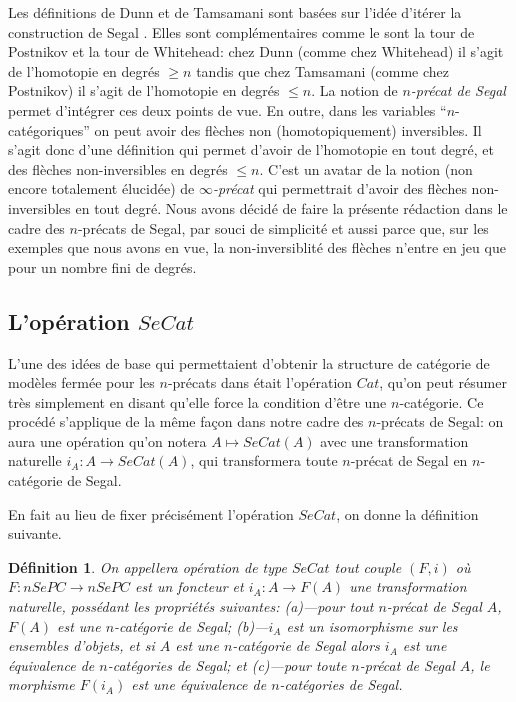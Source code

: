 \documentclass[12pt]{article}
\newcommand{\subnumero}[1]{\subsection*{#1}\phantomsection\addcontentsline{toc}{subsection}{#1}}
\newtheorem{definition}[lemma]{D\'efinition}
\begin{document}
Les d\'efinitions de Dunn et de Tamsamani
sont bas\'ees sur l'id\'ee d'it\'erer la construction de Segal
\cite{Segal}. Elles sont compl\'ementaires  comme le sont la
tour de Postnikov et la tour de Whitehead: chez Dunn (comme chez Whitehead)
il s'agit
de l'homotopie en degr\'es $\geq n$ tandis que chez Tamsamani (comme chez
Postnikov)
il s'agit de l'homotopie en degr\'es $\leq n$. La notion de {\em $n$-pr\'ecat de
Segal} permet d'int\'egrer ces deux points de vue. En outre, dans les variables
``$n$-cat\'egoriques'' on peut avoir des fl\`eches non (homotopiquement)
inversibles. Il s'agit donc d'une d\'efinition qui permet d'avoir de l'homotopie
en tout degr\'e, et des fl\`eches non-inversibles en degr\'es $\leq n$. C'est
un avatar de la notion (non encore totalement \'elucid\'ee) de {\em
$\infty$-pr\'ecat} qui
permettrait d'avoir des fl\`eches non-inversibles en tout degr\'e. Nous avons
d\'ecid\'e de faire la pr\'esente r\'edaction dans le cadre des $n$-pr\'ecats de
Segal, par souci de simplicit\'e et aussi parce que, sur les exemples que
nous avons en vue,
la non-inversiblit\'e des fl\`eches n'entre en jeu que pour un nombre fini
de degr\'es.


\subnumero{L'op\'eration \texorpdfstring{$SeCat$}{SeCat}}

L'une des id\'ees de base qui permettaient d'obtenir la structure de cat\'egorie
de mod\`eles ferm\'ee pour les $n$-pr\'ecats dans \cite{nCAT} \'etait
l'op\'eration $Cat$, qu'on peut r\'esumer tr\`es simplement en disant
qu'elle force
la condition d'\^etre une $n$-cat\'egorie. Ce proc\'ed\'e s'applique de la
m\^eme
fa\c{c}on dans
notre cadre des $n$-pr\'ecats de Segal: on aura une op\'eration qu'on notera
$A\mapsto SeCat(A)$ avec une transformation naturelle $i_A: A\rightarrow
SeCat(A)$, qui transformera toute $n$-pr\'ecat de Segal en
$n$-cat\'egorie de Segal.

En fait au lieu de fixer pr\'ecis\'ement l'op\'eration $SeCat$, on
donne la d\'efinition suivante.

\begin{definition}
\label{secat}
On appellera {\em op\'eration de type $SeCat$} tout couple $(F, i)$ o\`u
$F:nSePC\rightarrow nSePC$ est un foncteur et $i_A: A\rightarrow F(A)$ une
transformation naturelle, poss\'edant les propri\'et\'es suivantes:
\newline
(a)---pour tout $n$-pr\'ecat de Segal $A$, $F(A)$ est une $n$-cat\'egorie de
Segal;
\newline
(b)---$i_A$ est un isomorphisme sur les ensembles d'objets, et si $A$ est une
$n$-cat\'egorie de Segal alors $i_A$ est une \'equivalence de $n$-cat\'egories
de Segal; et
\newline
(c)---pour toute $n$-pr\'ecat de Segal $A$, le morphisme $F(i_A)$ est une
\'equivalence de $n$-cat\'egories de Segal.
\end{definition}
\end{document}
